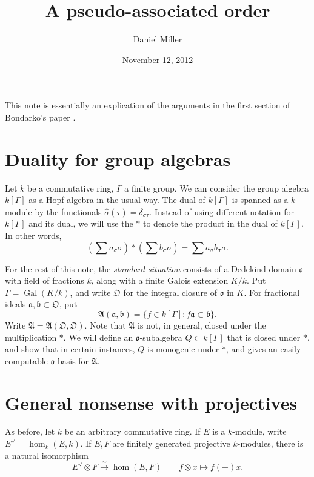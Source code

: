\documentclass{article}
\title{A pseudo-associated order}
\author{Daniel Miller}
\date{November 12, 2012}
\DeclareMathOperator{\gal}{Gal}
\newcommand{\fa}{\mathfrak{a}}
\newcommand{\fA}{\mathfrak{A}}
\newcommand{\fb}{\mathfrak{b}}
\newcommand{\fo}{\mathfrak{o}}
\newcommand{\fO}{\mathfrak{O}}
\newcommand{\iso}{\xrightarrow\sim}
\begin{document}
\maketitle





This note is essentially an explication of the arguments in the first section 
of Bondarko's paper \cite{bondarko-2000}. 





\section{Duality for group algebras}

Let $k$ be a commutative ring, $\Gamma$ a finite group. We can consider the 
group algebra $k[\Gamma]$ as a Hopf algebra in the usual way. The dual of 
$k[\Gamma]$ is spanned as a $k$-module by the functionals 
$\hat\sigma(\tau)=\delta_{\sigma\tau}$. Instead of using different notation for 
$k[\Gamma]$ and its dual, we will use the $\ast$ to denote the product in the 
dual of $k[\Gamma]$. In other words, 
\[
  \left(\sum a_\sigma \sigma\right) \ast \left(\sum b_\sigma \sigma\right) = \sum a_\sigma b_\sigma \sigma .
\]

For the rest of this note, the \emph{standard situation} consists of a 
Dedekind domain $\fo$ with field of fractions $k$, along with a finite Galois 
extension $K/k$. Put $\Gamma=\gal(K/k)$, and write $\fO$ for the integral 
closure of $\fo$ in $K$. For fractional ideals $\fa,\fb\subset\fO$, put 
\[
  \fA(\fa,\fb)=\{f\in k[\Gamma]:f\fa\subset \fb\} .
\]
Write $\fA=\fA(\fO,\fO)$. Note that $\fA$ is not, in general, closed under the 
multiplication $\ast$. We will define an $\fo$-subalgebra 
$Q\subset k[\Gamma]$ that is closed under $\ast$, and show that in certain 
instances, $Q$ is monogenic under $\ast$, and gives an easily computable 
$\fo$-basis for $\fA$. 





\section{General nonsense with projectives}

As before, let $k$ be an arbitrary commutative ring. If $E$ is a $k$-module, 
write $E^\vee=\hom_k(E,k)$. If $E,F$ are finitely generated projective 
$k$-modules, there is a natural isomorphism 
\[
  E^\vee\otimes F\iso \hom(E,F) \qquad f\otimes x\mapsto f(-) x .
\]
\end{document}
